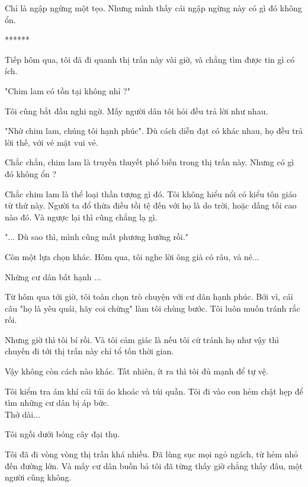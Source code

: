 Chỉ là ngập ngừng một tẹo. Nhưng mình thấy cái ngập ngừng này có gì đó không ổn. \\

\begin{center}
	******
\end{center}


Tiếp hôm qua, tôi đã đi quanh thị trấn này vài giờ, và chẳng tìm được tin gì có ích.

"Chim lam có tồn tại không nhỉ ?"

Tôi cũng bắt đầu nghi ngờ. Mấy người dân tôi hỏi đều trả lời như nhau.

"Nhờ chim lam, chúng tôi hạnh phúc". Dù cách diễn đạt có khác nhau, họ đều trả lời thế, với vẻ mặt vui vẻ.

Chắc chắn, chim lam là truyền thuyết phổ biến trong thị trấn này. Nhưng có gì đó không ổn ?

Chắc chim lam là thể loại thần tượng gì đó. Tôi không hiểu nổi có kiểu tôn giáo từ thứ này. Người ta đổ thừa điều tồi tệ đến với họ là do trời, hoặc dấng tối cao nào đó. Và ngược lại thì cũng chẳng lạ gì.

"... Dù sao thì, mình cũng mất phương hướng rồi."

Còn một lựa chọn khác. Hôm qua, tôi nghe lời ông già có râu, và né...

Những cư dân bất hạnh ...

Từ hôm qua tới giờ, tôi toàn chọn trò chuyện với cư dân hạnh phúc. Bởi vì, cái câu "họ là yêu quái, hãy coi chừng" làm tôi chùng bước. Tôi luôn muốn tránh rắc rối.

Nhưng giờ thì tôi bí rồi. Và tôi cảm giác là nếu tôi cứ tránh họ như vậy thì chuyến đi tới thị trấn này chỉ tổ tốn thời gian.

Vậy không còn cách nào khác. Tất nhiên, ít ra thì tôi đủ mạnh để tự vệ.

Tôi kiểm tra ám khí cái túi áo khoác và túi quần. Tôi đi vào con hẻm chật hẹp để tìm những cư dân bị áp bức.\\

Thở dài...

Tôi ngồi dưới bóng cây đại thụ.

Tôi đã đi vòng vòng thị trấn khá nhiều. Đã lùng sục mọi ngỏ ngách, từ hẻm nhỏ đến đường lớn. Và mấy cư dân buồn bả tôi đã từng thấy giờ chẳng thấy đâu, một người cũng không.


